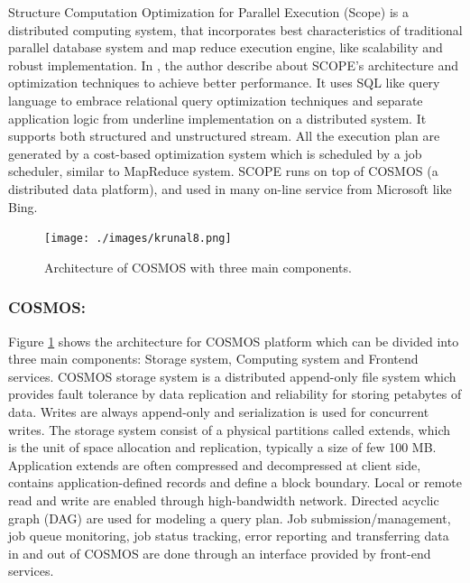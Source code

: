 \documentclass[runningheads,a4paper]{llncs}
\begin{document}
{Structure Computation Optimization for Parallel Execution (Scope) is a distributed computing system, that incorporates best characteristics of traditional parallel database system and map reduce execution engine, like scalability and robust implementation. In \cite{zhou2012scope}, the author describe about SCOPE's architecture and optimization techniques to achieve better performance. 
It uses SQL like query language to embrace relational query optimization techniques and separate application logic from underline implementation on a distributed system. It supports both structured and unstructured stream. All the execution plan are generated by a cost-based optimization system which is scheduled by a job scheduler, similar to MapReduce system. SCOPE runs on top of COSMOS (a distributed data platform), and used in many on-line service from Microsoft like Bing. \\

\begin{figure}[!ht]
	\texttt{[image: ./images/krunal8.png]}
	\centering
	\caption{Architecture of COSMOS with three main components\cite{zhou2012scope}.}
	\label{fig:krunal8}
\end{figure}

\subsubsection*{COSMOS: }
Figure \ref{fig:krunal8} shows the architecture for COSMOS platform which can be divided into three main components: Storage system, Computing system and Frontend services. COSMOS storage system is a distributed append-only file system which provides fault tolerance by data replication and reliability for storing petabytes of data. Writes are always append-only and serialization is used for concurrent writes. The storage system consist of a physical partitions called extends, which is the unit of space allocation and replication, typically a size of few 100 MB. Application extends are often compressed and decompressed at client side, contains application-defined records and define a block boundary. Local or remote read and write are enabled through high-bandwidth network. Directed acyclic graph (DAG) are used for modeling a query plan. Job submission/management, job queue monitoring, job status tracking, error reporting and transferring data in and out of COSMOS are done through an interface provided by front-end services. \\

}
\end{document}
